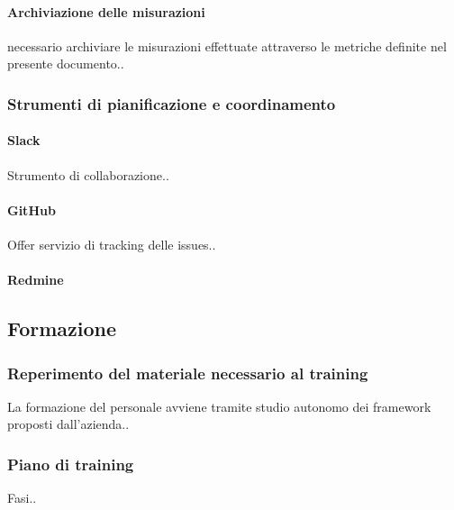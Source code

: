     		\paragraph{Archiviazione delle misurazioni}
    		necessario archiviare le misurazioni effettuate attraverso le metriche definite nel presente documento..
    		
    	\subsubsection{Strumenti di pianificazione e coordinamento}
    	
    		\paragraph{Slack} %
    		Strumento di collaborazione..
    		
    		\paragraph{GitHub}
    		Offer servizio di tracking delle issues..
    		
    		\paragraph{Redmine} %

			
	
	\subsection{Formazione}		
	
		\subsubsection{Reperimento del materiale necessario al training}
		La formazione del personale avviene tramite studio autonomo dei framework proposti dall'azienda..
		
		\subsubsection{Piano di training}
		Fasi..
		
    
    
    
    

